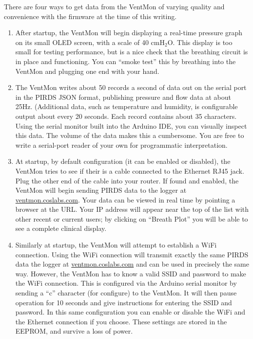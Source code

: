 \documentclass[11pt, letterpaper]{article}
\begin{document}
There are four ways to get data from the VentMon of varying quality and convenience with the firmware at the time of this writing.
\begin{enumerate}
\item After startup, the VentMon will begin displaying a real-time pressure graph on its small OLED screen, with a scale of 40 cmH$_2$O. This display is too small for testing performance, but is a nice check that the breathing circuit is in place and functioning. You can ``smoke test'' this by breathing into the VentMon and plugging one end with your hand.
\item The VentMon writes about 50 records a second of data out on the serial port in the PIRDS JSON format, publishing
  pressure and flow data at about 25Hz. (Additional data, such as temperature and humidity, is configurable output about every 20 seconds. Each record contains about 35 characters.
  Using the serial monitor built into the Arduino IDE, you can visually inspect this data. The volume of the data makes this a cumbersome. You are free to write a serial-port reader of your own for programmatic interpretation.
\item At startup, by default configuration (it can be enabled or disabled), the VentMon tries to see if their is a cable connected to the Ethernet RJ45 jack. Plug the other end of the cable into your router. If found and enabled, the VentMon will begin sending PIRDS\cite{PIRDS} data to the logger at \url{ventmon.coslabs.com}\cite{PIRDSlogger}. Your data can be viewed in real time by pointing a browser at the URL. Your IP address will appear near the top of the list with other recent or current users; by clicking on ``Breath Plot'' you will be able to see a complete clinical display.
\item Similarly at startup, the VentMon will attempt to establish a WiFi connection. Using the WiFi connection will transmit exactly the same PIRDS data the logger at \url{ventmon.coslabs.com} and can be used in precisely  the same way. However, the VentMon has to know a valid SSID and password to make the WiFi connection. This is configured via the Arduino serial monitor by sending a ``c'' character (for configure) to the VentMon. It will then pause operation for 10 seconds and give instructions for entering the SSID and password. In this same configuration you can enable or disable the WiFi and the Ethernet connection if you choose. These settings are stored in the EEPROM, and survive a loss of power.
\end{enumerate}
\end{document}
